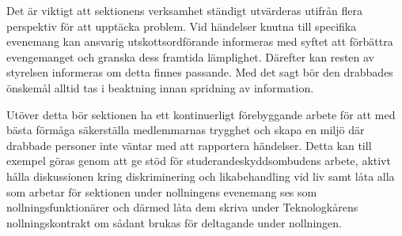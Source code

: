 \documentclass[10pt]{article}
\begin{document}
Det är viktigt att sektionens verksamhet ständigt utvärderas utifrån flera perspektiv för att upptäcka problem. Vid händelser knutna till specifika evenemang kan ansvarig utskottsordförande informeras med syftet att förbättra evengemanget och granska dess framtida lämplighet. Därefter kan resten av styrelsen informeras om detta finnes passande. Med det sagt bör den drabbades önskemål alltid tas i beaktning innan spridning av information.  

Utöver detta bör sektionen ha ett kontinuerligt förebyggande arbete för att med bästa förmåga säkerställa medlemmarnas trygghet och skapa en miljö där drabbade personer inte väntar med att rapportera händelser. Detta kan till exempel göras genom att ge stöd för studerandeskyddsombudens arbete, aktivt hålla diskussionen kring diskriminering och likabehandling vid liv samt låta alla som arbetar för sektionen under nollningens evenemang ses som nollningsfunktionärer och därmed låta dem skriva under Teknologkårens nollningskontrakt om sådant brukas för deltagande under nollningen.
\end{document}
